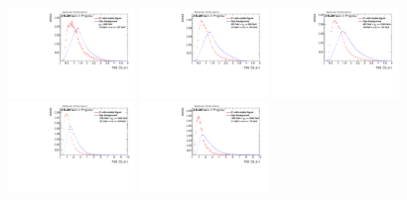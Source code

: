\begin{figure}[H]
\bigskip
\includegraphics[width=0.3\textwidth]{sascha_input/Appendix/Distributions/higgs/distributions/beta1/h_assisted_tj_D2_bin1.pdf} \hspace{1mm}
\includegraphics[width=0.3\textwidth]{sascha_input/Appendix/Distributions/higgs/distributions/beta1/h_assisted_tj_D2_bin2.pdf} \hspace{4mm}
\includegraphics[width=0.3\textwidth]{sascha_input/Appendix/Distributions/higgs/distributions/beta1/h_assisted_tj_D2_bin3.pdf} 
\bigskip
\includegraphics[width=0.3\textwidth]{sascha_input/Appendix/Distributions/higgs/distributions/beta1/h_assisted_tj_D2_bin4.pdf} \hspace{4mm}
\includegraphics[width=0.3\textwidth]{sascha_input/Appendix/Distributions/higgs/distributions/beta1/h_assisted_tj_D2_bin5.pdf} 


\end{figure}
